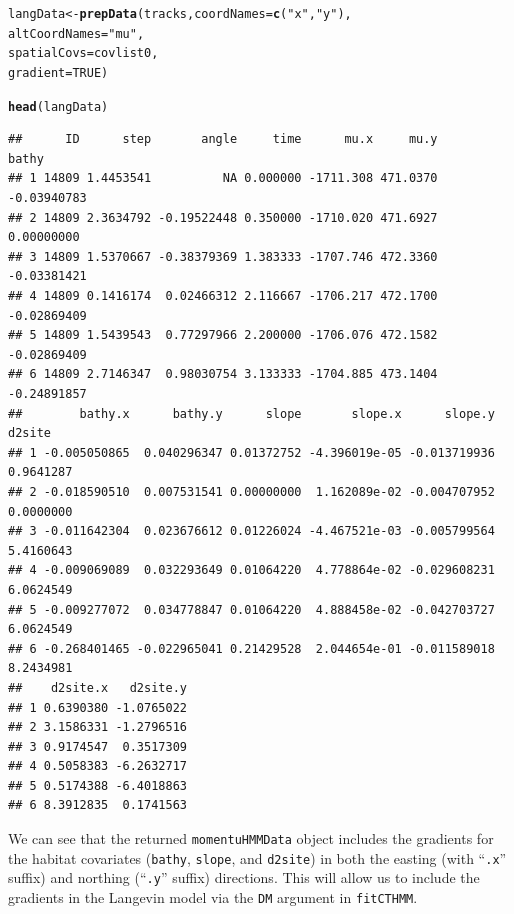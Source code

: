 \documentclass[12pt]{article}\usepackage[]{graphicx}\usepackage[]{xcolor}
\makeatletter
\newcommand{\hlnum}[1]{\textcolor[rgb]{0.686,0.059,0.569}{#1}}%
\newcommand{\hlsng}[1]{\textcolor[rgb]{0.192,0.494,0.8}{#1}}%
\newcommand{\hldef}[1]{\textcolor[rgb]{0.345,0.345,0.345}{#1}}%
\newcommand{\hlkwb}[1]{\textcolor[rgb]{0.69,0.353,0.396}{#1}}%
\newcommand{\hlkwc}[1]{\textcolor[rgb]{0.333,0.667,0.333}{#1}}%
\newcommand{\hlkwd}[1]{\textcolor[rgb]{0.737,0.353,0.396}{\textbf{#1}}}%
\newenvironment{kframe}{%
 \def\at@end@of@kframe{}%
 \ifinner\ifhmode%
  \def\at@end@of@kframe{\end{minipage}}%
  \begin{minipage}{\columnwidth}%
 \fi\fi%
 \def\FrameCommand##1{\hskip\@totalleftmargin \hskip-\fboxsep
 \colorbox{shadecolor}{##1}\hskip-\fboxsep
     \hskip-\linewidth \hskip-\@totalleftmargin \hskip\columnwidth}%
 \MakeFramed {\advance\hsize-\width
   \@totalleftmargin\z@ \linewidth\hsize
   \@setminipage}}%
 {\par\unskip\endMakeFramed%
 \at@end@of@kframe}
\newenvironment{knitrout}{}{} %
\makeatother
\begin{document}
\begin{knitrout}
\color{fgcolor}\begin{kframe}
\begin{alltt}
\hldef{langData} \hlkwb{<-} \hlkwd{prepData}\hldef{(tracks,}\hlkwc{coordNames} \hldef{=} \hlkwd{c}\hldef{(}\hlsng{"x"}\hldef{,}\hlsng{"y"}\hldef{),}
                      \hlkwc{altCoordNames} \hldef{=} \hlsng{"mu"}\hldef{,}
                      \hlkwc{spatialCovs} \hldef{= covlist0,}
                      \hlkwc{gradient}\hldef{=}\hlnum{TRUE}\hldef{)}
\end{alltt}
\end{kframe}
\end{knitrout}
\begin{knitrout}
\color{fgcolor}\begin{kframe}
\begin{alltt}
\hlkwd{head}\hldef{(langData)}
\end{alltt}
\begin{verbatim}
##      ID      step       angle     time      mu.x     mu.y       bathy
## 1 14809 1.4453541          NA 0.000000 -1711.308 471.0370 -0.03940783
## 2 14809 2.3634792 -0.19522448 0.350000 -1710.020 471.6927  0.00000000
## 3 14809 1.5370667 -0.38379369 1.383333 -1707.746 472.3360 -0.03381421
## 4 14809 0.1416174  0.02466312 2.116667 -1706.217 472.1700 -0.02869409
## 5 14809 1.5439543  0.77297966 2.200000 -1706.076 472.1582 -0.02869409
## 6 14809 2.7146347  0.98030754 3.133333 -1704.885 473.1404 -0.24891857
##        bathy.x      bathy.y      slope       slope.x      slope.y    d2site
## 1 -0.005050865  0.040296347 0.01372752 -4.396019e-05 -0.013719936 0.9641287
## 2 -0.018590510  0.007531541 0.00000000  1.162089e-02 -0.004707952 0.0000000
## 3 -0.011642304  0.023676612 0.01226024 -4.467521e-03 -0.005799564 5.4160643
## 4 -0.009069089  0.032293649 0.01064220  4.778864e-02 -0.029608231 6.0624549
## 5 -0.009277072  0.034778847 0.01064220  4.888458e-02 -0.042703727 6.0624549
## 6 -0.268401465 -0.022965041 0.21429528  2.044654e-01 -0.011589018 8.2434981
##    d2site.x   d2site.y
## 1 0.6390380 -1.0765022
## 2 3.1586331 -1.2796516
## 3 0.9174547  0.3517309
## 4 0.5058383 -6.2632717
## 5 0.5174388 -6.4018863
## 6 8.3912835  0.1741563
\end{verbatim}
\end{kframe}
\end{knitrout}
\noindent We can see that the returned \verb|momentuHMMData| object includes the gradients for the habitat covariates (\verb|bathy|, \verb|slope|, and \verb|d2site|) in both the easting (with ``\verb|.x|'' suffix) and northing (``\verb|.y|'' suffix) directions. This will allow us to include the gradients in the Langevin model via the \verb|DM| argument in \verb|fitCTHMM|. 
\end{document}
